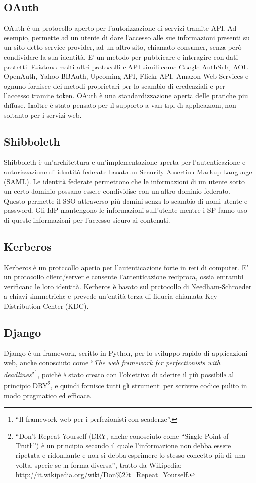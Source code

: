 \subsection{OAuth}
OAuth è un protocollo aperto per l'autorizzazione di servizi tramite
API. Ad esempio, permette ad un utente di dare l'accesso alle sue
informazioni presenti su un sito detto service provider, ad un altro
sito, chiamato consumer, senza però condividere la sua identità. E' un
metodo per pubblicare e interagire con dati protetti. Esistono molti
altri protocolli e API simili come Google AuthSub, AOL OpenAuth, Yahoo
BBAuth, Upcoming API, Flickr API, Amazon Web Services e ognuno
fornisce dei metodi proprietari per lo scambio di credenziali e per
l'accesso tramite token. OAuth è una standardizzazione aperta delle
pratiche piu diffuse. Inoltre è stato pensato per il supporto a vari
tipi di applicazioni, non soltanto per i servizi web.


\subsection{Shibboleth}
Shibboleth è un'architettura e un'implementazione aperta per
l'autenticazione e autorizzazione di identità federate basata su
Security Assertion Markup Language (SAML). Le identità federate
permettono che le informazioni di un utente sotto un certo dominio
possano essere condividise con un altro dominio federato. Questo
permette il SSO attraverso più domini senza lo scambio di nomi utente
e password. Gli IdP mantengono le informazioni sull'utente mentre i SP
fanno uso di queste informazioni per l'accesso sicuro ai contenuti.

\subsection{Kerberos}
Kerberos è un protocollo aperto per l'autenticazione forte in reti di
computer. E' un protocollo client/server e consente l'autenticazione
reciproca, ossia entrambi verificano le loro identità. Kerberos è
basato sul protocollo di Needham-Schroeder a chiavi simmetriche e
prevede un'entità terza di fiducia chiamata Key Distribution Center
(KDC).

\subsection{Django}\label{Django}
Django è un framework, scritto in Python, per lo sviluppo rapido di
applicazioni web, anche conosciuto come ``\emph{The web framework for
  perfectionists with deadlines}''\footnote{``Il framework web per i
  perfezionisti con scadenze''.}, poichè è stato creato con l'obiettivo
di aderire il più possibile al principio DRY\footnote{``Don't Repeat
  Yourself (DRY, anche conosciuto come ``Single Point of Truth'') è un
  principio secondo il quale l'informazione non debba essere ripetuta
  e ridondante e non si debba esprimere lo stesso concetto più di una
  volta, specie se in forma diversa'', tratto da Wikipedia:
  \url{http://it.wikipedia.org/wiki/Don\%27t_Repeat_Yourself}.}, e
quindi fornisce tutti gli strumenti per scrivere codice pulito in modo
pragmatico ed efficace.


